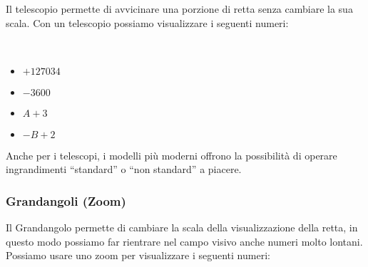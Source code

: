 Il telescopio permette di avvicinare una porzione di retta senza cambiare 
la sua scala. Con un telescopio possiamo visualizzare i seguenti numeri:

\newpage %

\begin{esempio} ~

\begin{multicols}{4}
\begin{itemize}[nosep]
 \item \(+127034\)
 \item \(-3600\)
 \item \(A+3\)
 \item \(-B+2\)
\end{itemize}
\end{multicols}
\vspace{-5mm}

\begin{inaccessibleblock}
\begin{minipage}{.48\linewidth}
 \begin{center}
\scalebox{0.7}{\telescopioa}
 \end{center}
\end{minipage}
\hfill
\begin{minipage}{.48\linewidth}
 \begin{center}
\scalebox{0.7}{\telescopiob}
 \end{center}
\end{minipage}
\end{inaccessibleblock}
\end{esempio}

Anche per i telescopi, i modelli più moderni offrono la possibilità di 
operare ingrandimenti ``standard'' o ``non standard'' a piacere.

\subsubsection{Grandangoli (Zoom)}
\label{subsec:insnum_zoom}

Il Grandangolo permette di cambiare la scala della visualizzazione della 
retta, in questo modo possiamo far rientrare nel campo visivo anche numeri 
molto lontani.
Possiamo usare uno zoom per visualizzare i seguenti numeri:

